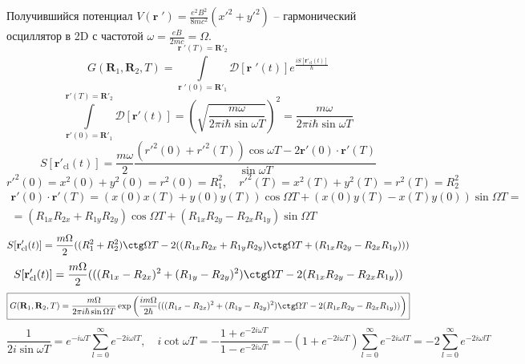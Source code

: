 \documentclass[12pt]{article}
\theoremstyle{definition}
\begin{document}
Получившийся потенциал $V(\textbf{r}\;')=\frac{e^2B^2}{8mc^2}(x'^2+y'^2)$ -- гармонический осциллятор в 2D с частотой $\omega=\frac{eB}{2mc}=\Omega$.
\begin{equation}
    G(\textbf{R}_1,\textbf{R}_2,T)=\int\limits_{\textbf{r}\;'(0)=\textbf{R}'_1}^{\textbf{r}\;'(T)=\textbf{R}'_2}\mathcal{D}[\textbf{r}\;'(t)]e^{\frac{iS[\textbf{r}'_\text{cl}(t)]}{\hbar}}
\end{equation}
\begin{equation}
    \int\limits_{\textbf{r}'(0)=\textbf{R}'_1}^{\textbf{r}'(T)=\textbf{R}'_2}\mathcal{D}[\textbf{r}'(t)]=\left(\sqrt{\frac{m\omega}{2\pi i\hbar\sin\omega T}}\right)^2=\frac{m\omega}{2\pi i\hbar\sin\omega T}
\end{equation}
\begin{equation}
    S[\textbf{r}'_\text{cl}(t)]=\frac{m\omega}{2}\frac{(r'^2(0)+r'^2(T))\cos\omega T-2 \textbf{r}'(0)\cdot\textbf{r}'(T)}{\sin\omega T}
\end{equation}
\begin{equation}
    r'^2(0)=x^2(0)+y^2(0)=r^2(0)=R_1^2,\quad r'^2(T)=x^2(T)+y^2(T)=r^2(T)=R_2^2
\end{equation}
\begin{multline}
    \textbf{r}'(0)\cdot\textbf{r}'(T)=(x(0)x(T)+y(0)y(T))\cos\Omega T+(x(0)y(T)-x(T)y(0))\sin\Omega T=\\=(R_{1x}R_{2x}+R_{1y}R_{2y})\cos\Omega T+(R_{1x}R_{2y}-R_{2x}R_{1y})\sin\Omega T
\end{multline}
\begin{equation}
    S[\textbf{r}'_\text{cl}(t)]=\frac{m\Omega}{2}((R^2_1+R^2_2)\ctg\Omega T-2((R_{1x}R_{2x}+R_{1y}R_{2y})\ctg\Omega T+(R_{1x}R_{2y}-R_{2x}R_{1y})))
\end{equation}
\begin{equation}
    S[\textbf{r}'_\text{cl}(t)]=\frac{m\Omega}{2}(((R_{1x}-R_{2x})^2+(R_{1y}-R_{2y})^2)\ctg\Omega T-2(R_{1x}R_{2y}-R_{2x}R_{1y}))
\end{equation}
\begin{equation*}
    \boxed{G(\textbf{R}_1,\textbf{R}_2,T)=\frac{m\Omega}{2\pi i\hbar\sin\Omega T}\exp\left(\frac{im\Omega}{2\hbar}(((R_{1x}-R_{2x})^2+(R_{1y}-R_{2y})^2)\ctg\Omega T-2(R_{1x}R_{2y}-R_{2x}R_{1y}))\right)}
\end{equation*}
\begin{equation*}
    \frac{1}{2i\sin\omega T}=e^{-i\omega T}\sum_{l=0}^{\infty}e^{-2i\omega lT},\quad i\cot\omega T=-\frac{1+e^{-2i\omega T}}{1-e^{-2i\omega T}}=-\left(1+e^{-2i\omega T}\right)\sum_{l=0}^{\infty}e^{-2i\omega lT}=-2\sum_{l=0}^{\infty}e^{-2i\omega lT}
\end{equation*}
\end{document}
